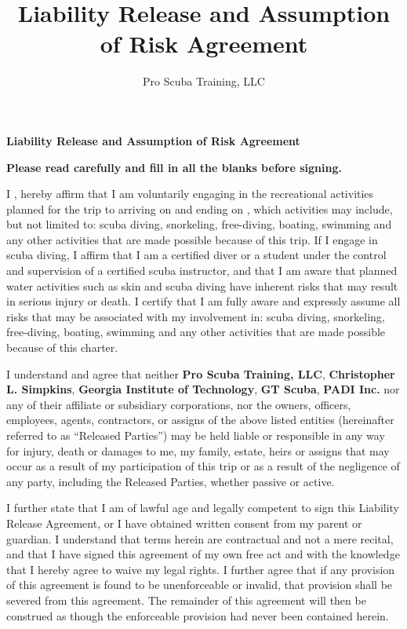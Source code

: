 \message{ !name(trip-liability.tex)}\documentclass[11pt]{article}
\title{Liability Release and Assumption of Risk Agreement}
\author{Pro Scuba Training, LLC}
\date{}
\begin{document}



\begin{center}
{\Large {\bf Liability Release and Assumption of Risk Agreement}}\\
\end{center}

{\bf Please read carefully and fill in all the blanks before signing.}

I \makebox[3in]{\hrulefill} , hereby affirm that I am voluntarily engaging in the recreational activities planned for the trip to \underline{\hspace{1in}} arriving on \underline{\hspace{.5in}} and ending on \underline{\hspace{.5in}}, which activities may include, but not limited to: scuba diving, snorkeling, free-diving, boating, swimming and any other activities that are made possible because of this trip. If I engage in scuba diving, I affirm that I am a certified diver or a student under the control and supervision of a certified scuba instructor, and that I am aware that planned water activities such as skin and scuba diving have inherent risks that may result in serious injury or death. I certify that I am fully aware and expressly assume all risks that may be associated with my involvement in: scuba diving, snorkeling, free-diving, boating, swimming and any other activities that are made possible because of this charter.

I understand and agree that neither {\bf Pro Scuba Training, LLC}, {\bf Christopher L. Simpkins}, {\bf Georgia Institute of Technology}, {\bf GT Scuba}, {\bf PADI Inc.} nor any of their affiliate or subsidiary corporations, nor the owners, officers, employees, agents, contractors, or assigns of the above listed entities (hereinafter referred to as “Released Parties”) may be held liable or responsible in any way for injury, death or damages to me, my family, estate, heirs or assigns that may occur as a result of my participation of this trip or as a result of the negligence of any party, including the Released Parties, whether passive or active.

I further state that I am of lawful age and legally competent to sign this Liability Release Agreement, or I have obtained written consent from my parent or guardian. I understand that terms herein are contractual and not a mere recital, and that I have signed this agreement of my own free act and with the knowledge that I hereby agree to waive my legal rights. I further agree that if any provision of this agreement is found to be unenforceable or invalid, that provision shall be severed from this agreement. The remainder of this agreement will then be construed as though the enforceable provision had never been contained herein.
\end{document}
